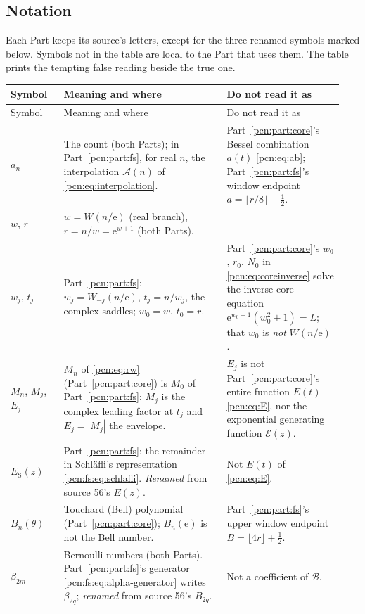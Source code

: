 \documentclass[11pt,letterpaper]{article}
\theoremstyle{remark}\newtheorem{remark}[theorem]{Remark}
\newcommand{\ee}{\mathrm e}
\begin{document}
\subsection*{Notation}
\label{pcn:guide:notation}
Each Part keeps its source's letters, except for the three renamed symbols marked below. Symbols not in the table are local to the Part that uses them. The table prints the tempting false reading beside the true one.

{\small
\begin{longtable}{@{}>{\raggedright\arraybackslash}p{0.15\linewidth}>{\raggedright\arraybackslash}p{0.46\linewidth}>{\raggedright\arraybackslash}p{0.33\linewidth}@{}}
\toprule
Symbol & Meaning and where & Do not read it as\\
\midrule
\endfirsthead
\toprule
Symbol & Meaning and where & Do not read it as\\
\midrule
\endhead
\bottomrule
\endfoot
$a_n$ & The count (both Parts); in Part~\ref{pcn:part:fs}, for real $n$, the interpolation $\mathcal A(n)$ of \eqref{pcn:eq:interpolation}. & Part~\ref{pcn:part:core}'s Bessel combination $a(t)$ \eqref{pcn:eq:ab}; Part~\ref{pcn:part:fs}'s window endpoint $a=\lfloor r/8\rfloor+\frac12$.\\
$w$, $r$ & $w=W(n/\ee)$ (real branch), $r=n/w=\ee^{w+1}$ (both Parts). & \\
$w_j$, $t_j$ & Part~\ref{pcn:part:fs}: $w_j=W_{-j}(n/\ee)$, $t_j=n/w_j$, the complex saddles; $w_0=w$, $t_0=r$. & Part~\ref{pcn:part:core}'s $w_0$, $r_0$, $N_0$ in \eqref{pcn:eq:coreinverse} solve the inverse core equation $\ee^{w_0+1}(w_0^2+1)=L$; that $w_0$ is \emph{not} $W(n/\ee)$.\\
$M_n$, $M_j$, $E_j$ & $M_n$ of \eqref{pcn:eq:rw} (Part~\ref{pcn:part:core}) is $M_0$ of Part~\ref{pcn:part:fs}; $M_j$ is the complex leading factor at $t_j$ and $E_j=|M_j|$ the envelope. & $E_j$ is not Part~\ref{pcn:part:core}'s entire function $E(t)$ \eqref{pcn:eq:E}, nor the exponential generating function $\mathcal E(z)$.\\
$E_{\mathrm S}(z)$ & Part~\ref{pcn:part:fs}: the remainder in Schl\"afli's representation \eqref{pcn:fs:eq:schlafli}. \emph{Renamed} from source 56's $E(z)$. & Not $E(t)$ of \eqref{pcn:eq:E}.\\
$B_n(\theta)$ & Touchard (Bell) polynomial (Part~\ref{pcn:part:core}); $B_n(\ee)$ is not the Bell number. & Part~\ref{pcn:part:fs}'s upper window endpoint $B=\lfloor4r\rfloor+\frac12$.\\
$\beta_{2m}$ & Bernoulli numbers (both Parts). Part~\ref{pcn:part:fs}'s generator \eqref{pcn:fs:eq:alpha-generator} writes $\beta_{2q}$; \emph{renamed} from source 56's $B_{2q}$. & Not a coefficient of $\mathcal B$.\\

\end{longtable}}
\end{document}
